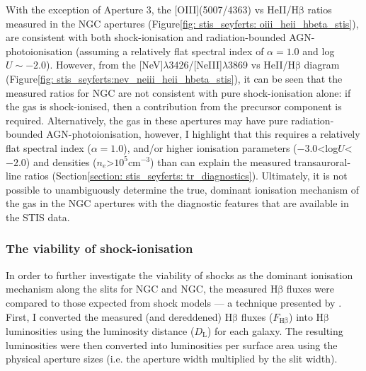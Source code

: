 With the exception of Aperture 3, the [OIII](5007/4363) vs HeII/H$\mathrm{\beta}$ ratios measured in the NGC apertures (Figure\;\ref{fig: stis_seyferts: oiii_heii_hbeta_stis}), are consistent with both shock-ionisation and radiation-bounded AGN-photoionisation (assuming a relatively flat spectral index of $\alpha=1.0$ and log\;$U\sim-2.0$). However, from the [NeV]$\lambda$3426/[NeIII]$\lambda$3869 vs HeII/H$\mathrm{\beta}$ diagram (Figure\;\ref{fig: stis_seyferts:nev_neiii_heii_hbeta_stis}), it can be seen that the measured ratios for NGC are not consistent with pure shock-ionisation alone: if the gas is shock-ionised, then a contribution from the precursor component is required. Alternatively, the gas in these apertures may have pure radiation-bounded AGN-photoionisation, however, I highlight that this requires a relatively flat spectral index ($\alpha=1.0$), and/or higher ionisation parameters ($-3.0$\;\textless\;log\;$U$\;\textless\;$-2.0$) and densities ($n_e$\;\textgreater\;$10^5$\;cm$^{-3}$) than can explain the measured transauroral-line ratios (Section\;\ref{section: stis_seyferts: tr_diagnostics}). Ultimately, it is not possible to unambiguously determine the true, dominant ionisation mechanism of the gas in the NGC apertures with the diagnostic features that are available in the STIS data.

\subsubsection{The viability of shock-ionisation}
\label{section: stis_seyferts: shock_viability}

In order to further investigate the viability of shocks as the dominant ionisation mechanism along the slits for NGC and NGC, the measured H$\mathrm{\beta}$ fluxes were compared to those expected from shock models --- a technique presented by \citet{Baron2017}. First, I converted the measured (and dereddened) H$\mathrm{\beta}$ fluxes ($F_\mathrm{H\beta}$) into H$\mathrm{\beta}$ luminosities using the luminosity distance ($D_\mathrm{L}$) for each galaxy. The resulting luminosities were then converted into luminosities per surface area using the physical aperture sizes (i.e. the aperture width multiplied by the slit width). 

